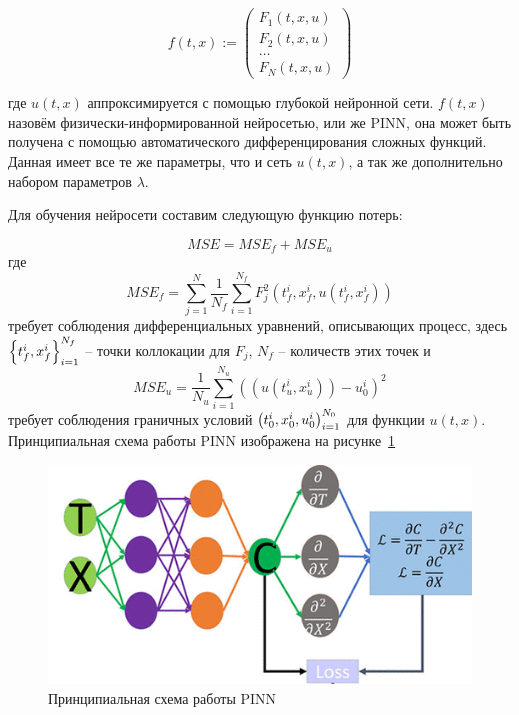 \documentclass[a4paper,14pt]{extarticle} %
\begin{document}
\begin{equation}
    f(t, x):=\begin{pmatrix}
        F_1(t,x,u) \\
        F_2(t,x,u) \\
        \dots      \\
        F_N(t,x,u)
    \end{pmatrix}
\end{equation}

где $u(t,x)$ аппроксимируется с помощью глубокой нейронной сети. $f(t,x)$ назовём физически-информированной нейросетью, или же PINN, она может быть получена с помощью автоматического дифференцирования сложных функций. Данная имеет все те же параметры, что и сеть $u(t,x)$, а так же дополнительно набором параметров $\lambda$.

Для обучения нейросети составим следующую функцию потерь:

\begin{equation}
    MSE = MSE_f + MSE_u
\end{equation}
где
\begin{equation}
    MSE_f = \sum_{j=1}^N\frac{1}{N_f}\sum_{i=1}^{N_f} F_j^2(t^i_f, x^i_f, u(t^i_f, x^i_f))
\end{equation}
требует соблюдения дифференциальных уравнений, описывающих процесс, здесь ${\left\{ t^i_f, x^i_f \right\}}_{i=1}^{N_f}$ -- точки коллокации для $F_j$, $N_f$ -- количеств этих точек и
\begin{equation}
    MSE_u = \frac{1}{N_u}\sum_{i=1}^{N_u} ((u(t^i_u, x^i_u)) - u^i_0)^2
\end{equation}
требует соблюдения граничных условий ${\left( t^i_0, x^i_0, u^i_0 \right)}_{i=1}^{N_0}$ для функции $u(t,x)$. Принципиальная схема работы PINN изображена на рисунке~\ref{fig:pinn_scheme}

\begin{figure}[ht]
    \center
    \includegraphics{PINN scheme.png}
    \caption{Принципиальная схема работы PINN}
    \label{fig:pinn_scheme}
\end{figure}
\end{document}

